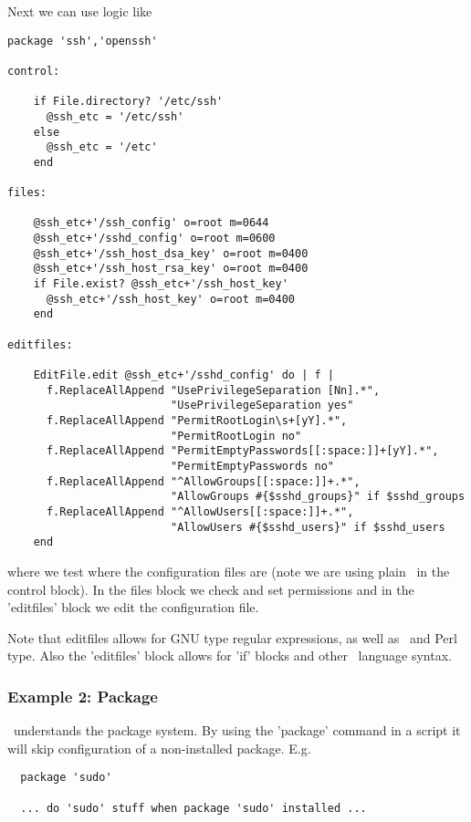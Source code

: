 Next we can use logic like

\scriptsize
\begin{verbatim}
package 'ssh','openssh'

control:

    if File.directory? '/etc/ssh'
      @ssh_etc = '/etc/ssh'
    else
      @ssh_etc = '/etc'
    end
   
files:

    @ssh_etc+'/ssh_config' o=root m=0644
    @ssh_etc+'/sshd_config' o=root m=0600
    @ssh_etc+'/ssh_host_dsa_key' o=root m=0400
    @ssh_etc+'/ssh_host_rsa_key' o=root m=0400
    if File.exist? @ssh_etc+'/ssh_host_key'
      @ssh_etc+'/ssh_host_key' o=root m=0400
    end

editfiles:

    EditFile.edit @ssh_etc+'/sshd_config' do | f |
      f.ReplaceAllAppend "UsePrivilegeSeparation [Nn].*",
                         "UsePrivilegeSeparation yes"
      f.ReplaceAllAppend "PermitRootLogin\s+[yY].*",
                         "PermitRootLogin no"
      f.ReplaceAllAppend "PermitEmptyPasswords[[:space:]]+[yY].*",
                         "PermitEmptyPasswords no"
      f.ReplaceAllAppend "^AllowGroups[[:space:]]+.*",
                         "AllowGroups #{$sshd_groups}" if $sshd_groups
      f.ReplaceAllAppend "^AllowUsers[[:space:]]+.*",
                         "AllowUsers #{$sshd_users}" if $sshd_users
    end

\end{verbatim}
\normalsize

where we test where the configuration files are (note we are using
plain \ruby\ in the control block). In the files block we check and
set permissions and in the 'editfiles' block we edit the configuration
file.

Note that editfiles allows for GNU type regular expressions, as well
as \ruby\ and Perl type. Also the 'editfiles' block allows for 'if'
blocks and other \ruby\ language syntax.

\subsubsection*{Example 2: Package}

\cfenjin\ understands the package system. By using the 'package' command
in a script it will skip configuration of a non-installed package. E.g.

\begin{verbatim}
  package 'sudo'

  ... do 'sudo' stuff when package 'sudo' installed ...
\end{verbatim}

